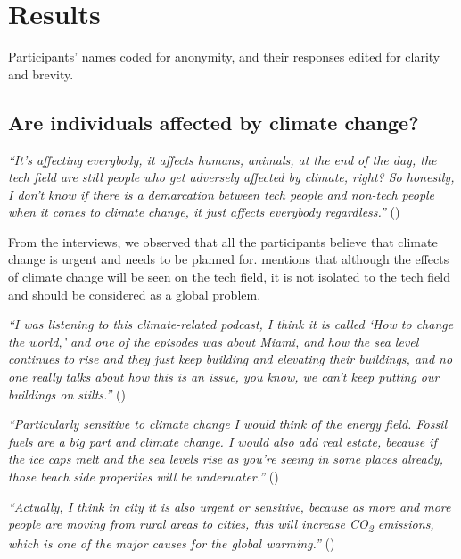 \section{Results}

Participants' names coded for anonymity, and their responses edited for clarity and brevity.

    \subsection{Are individuals affected by climate change?}
    
    \begin{quoting}
        \textit{``It's affecting everybody, it affects humans, animals, at the end of the day, the tech field are still people who get adversely affected by climate, right? So honestly, I don't know if there is a demarcation between tech people and non-tech people when it comes to climate change, it just affects everybody regardless.''} ()
    \end{quoting}

    From the interviews, we observed that all the participants believe that climate change is urgent and needs to be planned for.  mentions that although the effects of climate change will be seen on the tech field, it is not isolated to the tech field and should be considered as a global problem.
    
    \begin{quoting}
        \textit{``I was listening to this climate-related podcast, I think it is called `How to change the world,' and one of the episodes was about Miami, and how the sea level continues to rise and they just keep building and elevating their buildings, and no one really talks about how this is an issue, you know, we can't keep putting our buildings on stilts.''} ()
    \end{quoting}
    
    \begin{quoting}
        \textit{``Particularly sensitive to climate change I would think of the energy field. Fossil fuels are a big part and climate change. I would also add real estate, because if the ice caps melt and the sea levels rise as you're seeing in some places already, those beach side properties will be underwater.''} ()
    \end{quoting}

    \begin{quoting}
        \textit{``Actually, I think in city it is also urgent or sensitive, because as more and more people are moving from rural areas to cities, this will increase CO\textsubscript{2} emissions, which is one of the major causes for the global warming.''} ()
    \end{quoting}
    
